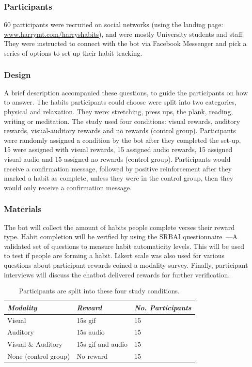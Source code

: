 \documentclass{scaffold/sigchi}
\begin{document}
\subsubsection{Participants}
60 participants were recruited on social networks (using the landing page: \url{www.harrymt.com/harryshabits}), and were mostly University students and staff. They were instructed to connect with the bot via Facebook Messenger and pick a series of options to set-up their habit tracking.

\subsubsection{Design}
A brief description accompanied these questions, to guide the participants on how to answer. The habits participants could choose were split into two categories, physical and relaxation. They were: stretching, press ups, the plank, reading, writing or meditation.\newline
\newline
The study used four conditions: visual rewards, auditory rewards, visual-auditory rewards and no rewards (control group). Participants were randomly assigned a condition by the bot after they completed the set-up, 15 were assigned with visual rewards, 15 assigned audio rewards, 15 assigned visual-audio and 15 assigned no rewards (control group).\newline
\newline
Participants would receive a confirmation message, followed by positive reinforcement after they marked a habit as complete, unless they were in the control group, then they would only receive a confirmation message.

\subsubsection{Materials}
The bot will collect the amount of habits people complete verses their reward type. Habit completion will be verified by using the SRBAI questionnaire~\cite{article_4q_SRBAI}---A validated set of questions to measure habit automaticity levels. This will be used to test if people are forming a habit. Likert scale was also used for various questions about participant rewards coined a modality survey. Finally, participant interviews will discuss the chatbot delivered rewards for further verification.

\begin{table}
  \centering
  \begin{tabular}{l l l}
    {\small\textit{Modality}} & {\small \textit{Reward}} & {\small \textit{No. Participants}}\\
    \midrule
    Visual & 15s gif & 15 \\
    Auditory & 15s audio & 15 \\
    Visual \& Auditory & 15s gif and audio & 15 \\
    None (control group) & No reward & 15 \\
  \end{tabular}
  \caption{Participants are split into these four study conditions.}~\label{tab:precise_rewards}
\end{table}
\end{document}
